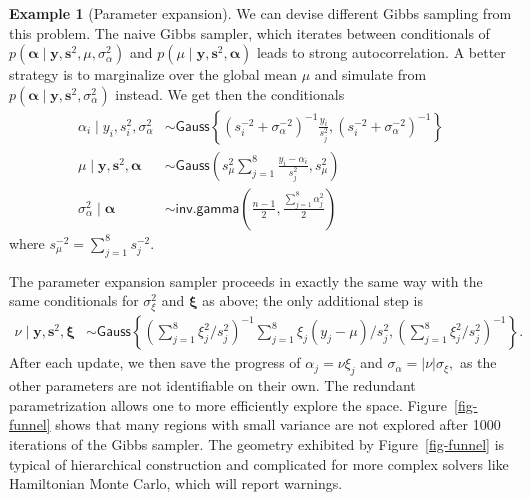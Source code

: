 \documentclass[
  11pt,
  letterpaper,
]{scrbook}
\theoremstyle{definition}
\theoremstyle{plain}
\theoremstyle{plain}
\theoremstyle{plain}
\theoremstyle{definition}
\newtheorem{example}{Example}[chapter]
\theoremstyle{definition}
\theoremstyle{remark}
\begin{document}
\begin{example}[Parameter
expansion]
We can devise different Gibbs sampling from this problem. The naive
Gibbs sampler, which iterates between conditionals of
\(p(\boldsymbol{\alpha} \mid \boldsymbol{y}, \boldsymbol{s}^2, \mu, \sigma^2_{\alpha})\)
and
\(p(\mu \mid \boldsymbol{y}, \boldsymbol{s}^2, \boldsymbol{\alpha})\)
leads to strong autocorrelation. A better strategy is to marginalize
over the global mean \(\mu\) and simulate from
\(p(\boldsymbol{\alpha} \mid \boldsymbol{y}, \boldsymbol{s}^2, \sigma^2_{\alpha})\)
instead. We get then the conditionals \begin{align*}
\alpha_i \mid y_i, s_i^2, \sigma^2_{\alpha} &\sim \mathsf{Gauss}\left\{ \left(s^{-2}_i + \sigma^{-2}_{\alpha}\right)^{-1}\frac{y_i}{s^2_j}, \left(s^{-2}_i + \sigma^{-2}_{\alpha}\right)^{-1}\right\}\\
\mu \mid \boldsymbol{y}, \boldsymbol{s}^2, \boldsymbol{\alpha} & \sim \mathsf{Gauss}\left( s^2_{\mu} \sum_{j=1}^8 \frac{y_i-\alpha_i}{s^2_j}, s^2_{\mu}\right)\\
\sigma^2_{\alpha} \mid \boldsymbol{\alpha} &\sim \mathsf{inv. gamma}\left( \frac{n-1}{2}, \frac{\sum_{j=1}^8 \alpha_j^2}{2}\right)
\end{align*} where \(s^{-2}_{\mu} =\sum_{j=1}^8 s_j^{-2}.\)

The parameter expansion sampler proceeds in exactly the same way with
the same conditionals for \(\sigma_{\xi}^2\) and \(\boldsymbol{\xi}\) as
above; the only additional step is \begin{align*}
\nu \mid \boldsymbol{y}, \boldsymbol{s}^2, \boldsymbol{\xi} & \sim \mathsf{Gauss}\left\{ \left( \sum_{j=1}^8 \xi_j^2/s_j^2\right)^{-1} \sum_{j=1}^8 \xi_j(y_j-\mu)/s^2_j, \left( \sum_{j=1}^8 \xi_j^2/s_j^2\right)^{-1}\right\}.
\end{align*} After each update, we then save the progress of
\(\alpha_j = \nu \xi_j\) and \(\sigma_\alpha = |\nu|\sigma_\xi,\) as the
other parameters are not identifiable on their own. The redundant
parametrization allows one to more efficiently explore the space.
Figure~\ref{fig-funnel} shows that many regions with small variance are
not explored after 1000 iterations of the Gibbs sampler. The geometry
exhibited by Figure~\ref{fig-funnel} is typical of hierarchical
construction and complicated for more complex solvers like Hamiltonian
Monte Carlo, which will report warnings.

\begin{figure}[ht!]

\centering{

}
\end{figure}
\end{example}
\end{document}
